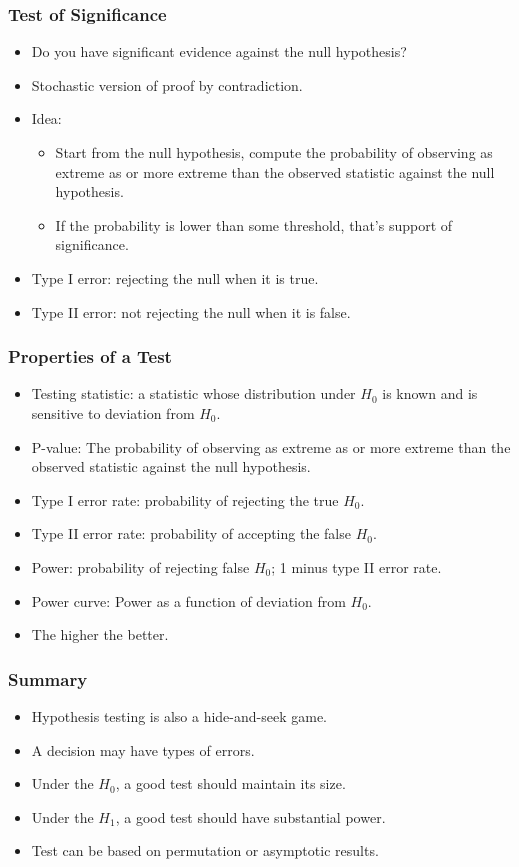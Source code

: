 \documentclass[leqno]{beamer}
\begin{document}
\begin{frame}
  \frametitle{Test of Significance}
  \begin{itemize}
  \item
    Do you have significant evidence against the null hypothesis?
  \item
    Stochastic version of proof by contradiction.
  \item
    Idea:
    \begin{itemize}
    \item
      Start from the null hypothesis, compute the probability of
      observing as extreme as or more extreme than the observed
      statistic against the null hypothesis.
    \item
      If the probability is lower than some threshold, that’s support of
      significance.
    \end{itemize}
  \item
    Type I error: rejecting the null when it is true.
  \item
    Type II error: not rejecting the null when it is false.
  \end{itemize}
\end{frame}


\begin{frame}
  \frametitle{Properties of a Test}
  \begin{itemize}
  \item
    Testing statistic: a statistic whose distribution under $H_0$ is
    known and is sensitive to deviation from $H_0$.
  \item
    P-value: The probability of observing as extreme as or more
    extreme than the observed statistic against the null hypothesis.    
  \item
    Type I error rate: probability of rejecting the true $H_0$.
  \item
    Type II error rate: probability of accepting the false $H_0$.
  \item
    Power: probability of rejecting false $H_0$; 1 minus type II error rate.
  \item
    Power curve: Power as a function of deviation from $H_0$.
  \item
    The higher the better. 
  \end{itemize}
\end{frame}


\begin{frame}
  \frametitle{Summary}
  \begin{itemize}
  \item
    Hypothesis testing is also a hide-and-seek game.
  \item
    A decision may have types of errors.
  \item
    Under the $H_0$, a good test should maintain its size.
  \item
    Under the $H_1$, a good test should have substantial power.
  \item
    Test can be based on permutation or asymptotic results.
  \end{itemize}
\end{frame}
\end{document}
